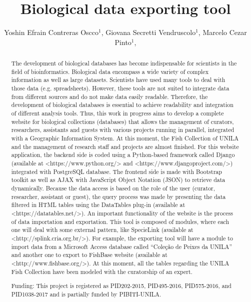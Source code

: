 \documentclass[twoside]{article}
\title{\vspace{-15mm}\fontsize{24pt}{10pt}\selectfont\textbf{ Biological data exporting tool }} %
\author{ Yoshin Efrain Contreras Oscco$^{1}$, Giovana Secretti Vendruscolo$^{1}$, Marcelo Cezar Pinto$^{1}$, }
\affil{ 1 UNILA

 }
\date{}
\begin{document}
  
  
  \maketitle %
  
  
  \thispagestyle{fancy} %
  
  
  \begin{abstract}
  The development of biological databases has become indispensable for scientists in the field of bioinformatics. Biological data encompass a wide variety of complex information as well as large datasets. Scientists have used many tools to deal with those data (e.g. spreadsheets). However, these tools are not suited to integrate data from different sources and do not make data easily readable. Therefore, the development of biological databases is essential to achieve readability and integration of different analysis tools. Thus, this work in progress aims to develop a complete website for biological collections (databases) that allows the management of curators, researchers, assistants and guests with various projects running in parallel, integrated with a Geographic Information System. At this moment, the Fish Collection of UNILA and the management of research staff and projects are almost finished. For this website application, the backend side is coded using a Python-based framework called Django (available at <https://www.python.org/> and <https://www.djangoproject.com/>) integrated with PostgreSQL database. The frontend side is made with Bootstrap toolkit as well as AJAX with JavaScript Object Notation (JSON) to retrieve data dynamically. Because the data access is based on the role of the user (curator, researcher, assistant or guest), the query process was made by presenting the data filtered in HTML tables using the DataTables plug-in (available at <https://datatables.net/>). An important functionality of the website is the process of data importation and exportation. This tool is composed of modules, where each one will deal with some external pattern, like SpecieLink (available at <http://splink.cria.org.br/>). For example, the exporting tool will have a module to import data from a Microsoft Access database called “Cole\c{c}\~ao de Peixes da UNILA” and another one to export to FishBase website (available at <http://www.fishbase.org/>). At this moment, all the tables regarding the UNILA Fish Collection have been modeled with the curatorship of an expert.
  
  Funding: This project is registered as PID202-2015, PID495-2016, PID575-2016, and PID1038-2017 and is partially funded by PIBITI-UNILA. \\ 
  \end{abstract}
  
\end{document}
